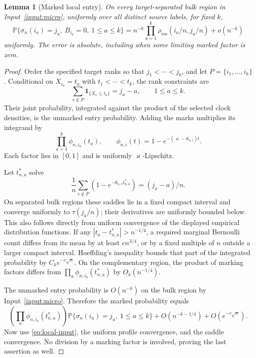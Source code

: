 \documentclass[11pt]{article}
\numberwithin{equation}{section}
\newtheorem{lemma}[theorem]{Lemma}
\theoremstyle{definition}
\theoremstyle{remark}
\newcommand{\Pp}{\mathbb P}
\newcommand{\one}{\mathbf 1}
\begin{document}
\begin{lemma}[Marked local entry]\label{lem:marked-local}
On every target-separated bulk region in Input~\ref{input:micro}, uniformly over all distinct source labels, for fixed $k$,
\begin{equation}\label{eq:marked-local}
 \Pp\{\sigma_n(i_a)=j_a,\ B_{i_a}=0,\ 1\le a\le k\}
 =n^{-k}\prod_{a=1}^k \rho_{\mathrm{res}}(i_a/n,j_a/n)+o(n^{-k})
\end{equation}
uniformly. The error is absolute, including when some limiting marked factor is zero.
\end{lemma}
\begin{proof}
Order the specified target ranks so that $j_1<\cdots<j_k$, and let $P=\{i_1,\ldots,i_k\}$. Conditional on $X_{i_a}=t_a$ with $t_1<\cdots<t_k$, the rank constraints are
\[
 \sum_{v\notin P}\one_{\{X_v\le t_a\}}=j_a-a,
 \qquad 1\le a\le k.
\]
Their joint probability, integrated against the product of the selected clock densities, is the unmarked entry probability. Adding the marks multiplies its integrand by
\[
 \prod_{a=1}^k\phi_{n,i_a}(t_a),\qquad
 \phi_{n,i}(t)=1-e^{-(\varkappa-\theta_{n,i})t}.
\]
Each factor lies in $[0,1]$ and is uniformly $\varkappa$-Lipschitz.

Let $t_{n,a}^*$ solve
\[
 \frac1n\sum_{v\notin P}(1-e^{-\theta_{n,v}t_{n,a}^*})=(j_a-a)/n.
\]
On separated bulk regions these saddles lie in a fixed compact interval and converge uniformly to $\tau(j_a/n)$; their derivatives are uniformly bounded below. This also follows directly from uniform convergence of the displayed empirical distribution functions. If any $|t_a-t_{n,a}^*|>n^{-1/4}$, a required marginal Bernoulli count differs from its mean by at least $c n^{3/4}$, or by a fixed multiple of $n$ outside a larger compact interval. Hoeffding's inequality \cite{Hoeffding} bounds that part of the integrated probability by $C_k e^{-c\sqrt n}$. On the complementary region, the product of marking factors differs from $\prod_a\phi_{n,i_a}(t_{n,a}^*)$ by $O_k(n^{-1/4})$.

The unmarked entry probability is $O(n^{-k})$ on the bulk region by Input~\ref{input:micro}. Therefore the marked probability equals
\[
 \left(\prod_a\phi_{n,i_a}(t_{n,a}^*)\right)
 \Pp\{\sigma_n(i_a)=j_a,\ 1\le a\le k\}
 +O(n^{-k-1/4})+O(e^{-c\sqrt n}).
\]
Now use \eqref{eq:local-input}, the uniform profile convergence, and the saddle convergence. No division by a marking factor is involved, proving the last assertion as well.
\end{proof}
\end{document}
